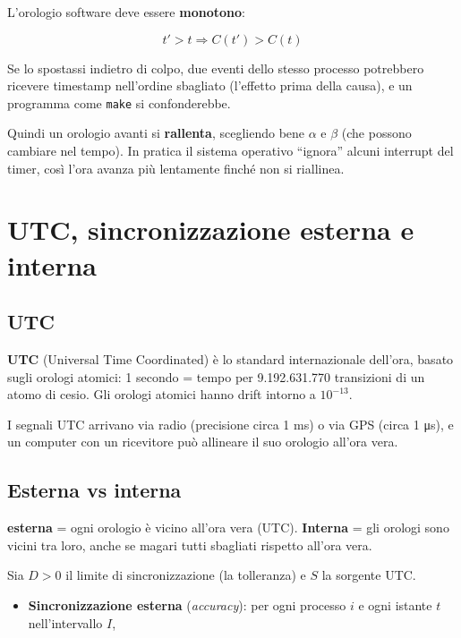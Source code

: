 L'orologio software deve essere \textbf{monotono}:

\[
t' > t \Rightarrow C(t') > C(t)
\]

Se lo spostassi indietro di colpo, due eventi dello stesso processo potrebbero ricevere timestamp nell'ordine sbagliato (l'effetto prima della causa), e un programma come \texttt{make} si confonderebbe.

Quindi un orologio avanti si \textbf{rallenta}, scegliendo bene \(\alpha\) e \(\beta\) (che possono cambiare nel tempo). In pratica il sistema operativo ``ignora'' alcuni interrupt del timer, così l'ora avanza più lentamente finché non si riallinea.

\section{UTC, sincronizzazione esterna e interna}

\subsection{UTC}

\textbf{UTC} (Universal Time Coordinated) è lo standard internazionale dell'ora, basato sugli orologi atomici: 1 secondo = tempo per 9.192.631.770 transizioni di un atomo di cesio. Gli orologi atomici hanno drift intorno a \(10^{-13}\).

I segnali UTC arrivano via radio (precisione circa 1 ms) o via GPS (circa 1 μs), e un computer con un ricevitore può allineare il suo orologio all'ora vera.

\subsection{Esterna vs interna}

\begin{inbreve}

\textbf{esterna} = ogni orologio è vicino all'ora vera (UTC). \textbf{Interna} = gli orologi sono vicini tra loro, anche se magari tutti sbagliati rispetto all'ora vera.

\end{inbreve}

Sia \(D > 0\) il limite di sincronizzazione (la tolleranza) e \(S\) la sorgente UTC.

\begin{itemize}
\tightlist
\item
  \textbf{Sincronizzazione esterna} (\emph{accuracy}): per ogni processo \(i\) e ogni istante \(t\) nell'intervallo \(I\),
\end{itemize}

